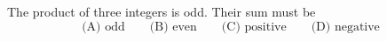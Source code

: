 The product of three integers is odd. Their sum must be
\[
\text{(A) odd}\qquad\text{(B) even}\qquad\text{(C) positive}\qquad\text{(D) negative}
\]
